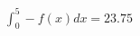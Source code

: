 \documentclass[preview]{standalone}
\begin{document}
\begin{align*}
\int_0^5 -f(x) dx = 23.75
\end{align*}
\end{document}
